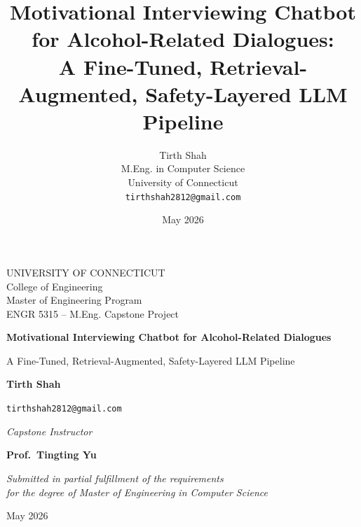 \documentclass[11pt,letterpaper]{article}
\title{\textbf{Motivational Interviewing Chatbot for Alcohol-Related Dialogues:\\
A Fine-Tuned, Retrieval-Augmented, Safety-Layered LLM Pipeline}}
\author{Tirth Shah\\
        \small M.Eng. in Computer Science\\
        \small University of Connecticut\\
        \small \texttt{tirthshah2812@gmail.com}}
\date{May 2026}
\begin{document}
\begin{titlepage}
    \centering
    \vspace*{1cm}

    {\large UNIVERSITY OF CONNECTICUT \\[0.2em]
            College of Engineering \\
            Master of Engineering Program \\
            ENGR 5315 -- M.Eng. Capstone Project \par}

    \vspace{3cm}

    {\Huge \bfseries Motivational Interviewing Chatbot for Alcohol-Related Dialogues \par}
    \vspace{0.6cm}
    {\Large A Fine-Tuned, Retrieval-Augmented, Safety-Layered LLM Pipeline\par}

    \vspace{2.5cm}

    {\large \textbf{Tirth Shah} \par}
    \vspace{0.2cm}
    {\large \texttt{tirthshah2812@gmail.com} \par}

    \vspace{1.5cm}

    {\large \textit{Capstone Instructor} \par}
    {\large \textbf{Prof.\ Tingting Yu} \par}

    \vspace{1.5cm}

    {\large \textit{Submitted in partial fulfillment of the requirements\\
                    for the degree of Master of Engineering in Computer Science}\par}

    \vfill

    {\large May 2026 \par}
\end{titlepage}

\end{document}
